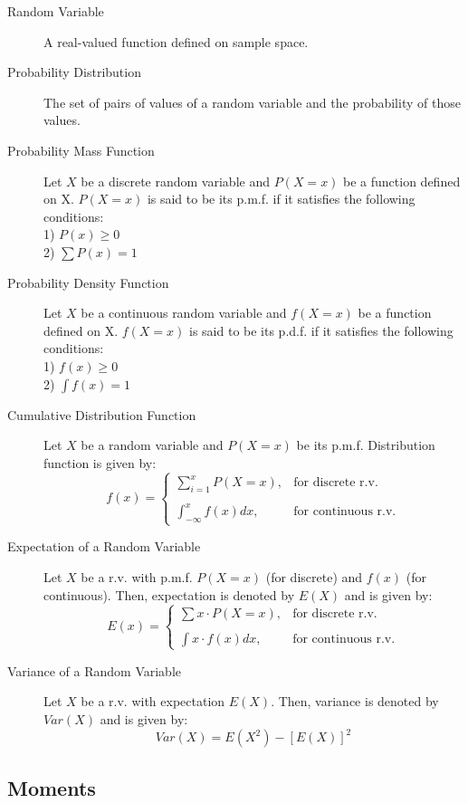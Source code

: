 \documentclass[
10pt, %
a4paper, %
]{report}
\begin{document}
\begin{description}
  \item[Random Variable]
    A real-valued function defined on sample space.
  \item[Probability Distribution]
    The set of pairs of values of a random variable and the probability of those values.
  \item[Probability Mass Function]
    Let \(X\) be a discrete random variable and \(P(X=x)\) be a function defined on X. \(P(X=x)\) is said to be its p.m.f. if it satisfies the following conditions: \\
    1) \(P(x)\geq 0\) \\
    2) \(\sum P(x) = 1\)
  \item[Probability Density Function]
    Let \(X\) be a continuous random variable and \(f(X=x)\) be a function defined on X. \(f(X=x)\) is said to be its p.d.f. if it satisfies the following conditions: \\
    1) \(f(x)\geq 0\) \\
    2) \(\int f(x) = 1\)
  \item[Cumulative Distribution Function]
    Let \(X\) be a random variable and \(P(X=x)\) be its p.m.f. Distribution function is given by:
    \[
    f(x)= 
        \begin{cases}
            \sum_{i=1}^x P(X=x),        & \text{for discrete r.v.} \\ \\
            \int_{-\infty}^x f(x)dx,    & \text{for continuous r.v.}
        \end{cases}
    \]
  \item[Expectation of a Random Variable]
    Let \(X\) be a r.v. with p.m.f. \(P(X=x)\) (for discrete) and \(f(x)\) (for continuous). Then, expectation is denoted by \(E(X)\) and is given by:
    \[
    E(x)= 
        \begin{cases}
            \sum x\cdot P(X=x),    & \text{for discrete r.v.} \\ \\
            \int x\cdot f(x)dx,    & \text{for continuous r.v.}
        \end{cases}
    \]
\item[Variance of a Random Variable]
    Let \(X\) be a r.v. with expectation \(E(X)\). Then, variance is denoted by \(Var(X)\) and is given by:
    \[
    Var(X) = E(X^2)-[E(X)]^2
    \]
\end{description}

\subsection*{Moments}
\end{document}
